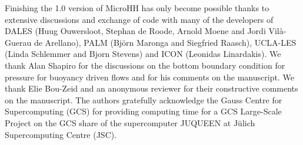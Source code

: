\documentclass[gmd,manuscript]{copernicus}
\begin{document}
\begin{acknowledgements}
Finishing the 1.0 version of MicroHH has only become possible thanks to extensive discussions and exchange of code with many of the developers of DALES (Huug Ouwersloot, Stephan de Roode, Arnold Moene and Jordi Vil\`{a}-Guerau de Arellano), PALM (Bj\"{o}rn Maronga and Siegfried Raasch), UCLA-LES (Linda Schlemmer and Bjorn Stevens) and ICON (Leonidas Linardakis). We thank Alan Shapiro for the discussions on the bottom boundary condition for pressure for buoyancy driven flows and for his comments on the manuscript. We thank Elie Bou-Zeid and an anonymous reviewer for their constructive comments on the manuscript. The authors gratefully acknowledge the Gauss Centre for Supercomputing (GCS) for providing computing time for a GCS Large-Scale Project on the GCS share of the supercomputer JUQUEEN at J\"{u}lich Supercomputing Centre (JSC). 
\end{acknowledgements}


%

\end{document}
